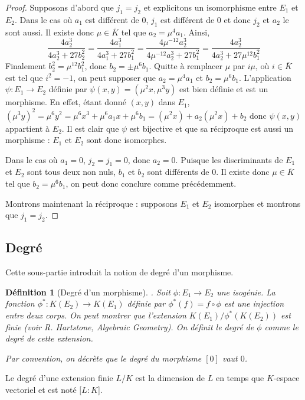 \documentclass{article}
\theoremstyle{plain}%
\newtheorem{deff}[thm]{Définition}
\theoremstyle{definition}%
\newcommand{\ol}{\overline}
\begin{document}
\begin{proof}
  Supposons d'abord que $j_1 = j_2$ et explicitons un isomorphisme entre $E_1$ et $E_2$. Dans le cas où $a_1$ est différent de $0$, $j_1$ est différent de $0$ et donc $j_2$ et $a_2$ le sont aussi. Il existe donc $\mu \in \ol K$ tel que $a_2 = \mu^4 a_1$. Ainsi,
  $$ \frac{4a_2^3}{4a_2^3 +27b_2^2} = \frac{4a_1^3}{4a_1^3+27b_1^2} =\frac{4\mu^{-12}a_2^3}{4\mu^{-12}a_2^3 + 27b_1^2} = \frac{4a_2^3}{4a_2^3+ 27\mu^{12} b_1^2}$$
  Finalement $b_2^2 = \mu^{12}b_1^2$, donc $b_2 = \pm \mu^6 b_1$. Quitte à remplacer $\mu$ par $i\mu$, où $i\in \ol K$ est tel que $i^2 = -1$, on peut supposer que $a_2 = \mu^4 a_1$ et $b_2 = \mu^6 b_1$. L'application $\psi : E_1\to E_2$ définie par $\psi(x, y) = (\mu ^2x, \mu ^3 y)$ est bien définie et est un morphisme. En effet, étant donné $(x, y)$ dans $E_1$, $(\mu^3y)^2 = \mu^6 y^2 = \mu^6 x^3 + \mu^6 a_1 x + \mu^6 b_1 = (\mu ^2 x) + a_2(\mu^2x)+ b_2$ donc $\psi(x, y)$ appartient à $E_2$. Il est clair que $\psi$ est bijective et que sa réciproque est aussi un morphisme : $E_1$ et $E_2$ sont donc isomorphes.

  Dans le cas où $a_1 = 0$, $j_2 = j_1 = 0$, donc $a_2 = 0$. Puisque les discriminants de $E_1$ et $E_2$ sont tous deux non nuls, $b_1$ et $b_2$ sont différents de $0$. Il existe donc $\mu \in \ol K$ tel que $b_2 = \mu^6 b_1$, on peut donc conclure comme précédemment.

  Montrons maintenant la réciproque : supposons $E_1$ et $E_2$ isomorphes et montrons que $j_1 = j_2$.
\end{proof}

\subsection{Degré}

Cette sous-partie introduit la notion de degré d'un morphisme.

\begin{deff}[Degré d'un morphisme]. 
  Soit $\phi : E_1 \to E_2$ une isogénie. La fonction $\phi^* : K(E_2) \to K(E_1)$ définie par $\phi^*(f) = f \circ \phi$ est une injection entre deux corps. On peut montrer que l'extension $K(E_1)/\phi^*(K(E_2))$ est finie (voir R. Hartstone, Algebraic Geometry). On définit le degré de $\phi$ comme le degré de cette extension.
  
  Par convention, on décrète que le degré du morphisme $[0]$ vaut $0$.
\end{deff}

Le degré d'une extension finie $L/K$ est la dimension de $L$ en temps que $K$-espace vectoriel et est noté $[L : K$].
\end{document}
